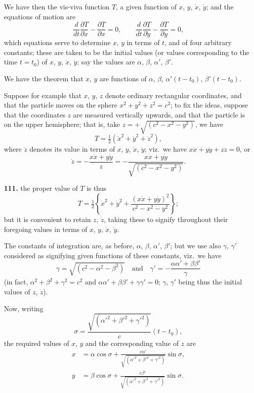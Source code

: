\documentclass[11pt,a4paper]{article}
\theoremstyle{plain}
\begin{document}
We have then the vis-viva function $T$, a given function of $x$, $y$, $\dot{x}$, $\dot{y}$; and the equations of motion are
\[
\frac{d}{dt}\frac{\partial T}{\partial \dot{x}} - \frac{\partial T}{\partial x} = 0, \qquad
\frac{d}{dt}\frac{\partial T}{\partial \dot{y}} - \frac{\partial T}{\partial y} = 0,
\]
which equations serve to determine $x$, $y$ in terms of $t$, and of four arbitrary constants; these are taken to be the initial values (or values corresponding to the time $t = t_0$) of $x$, $y$, $\dot{x}$, $\dot{y}$; say the values are $\alpha$, $\beta$, $\alpha'$, $\beta'$.

We have the theorem that $x$, $y$ are functions of $\alpha$, $\beta$, $\alpha'(t - t_0)$, $\beta'(t - t_0)$.

Suppose for example that $x$, $y$, $z$ denote ordinary rectangular coordinates, and that the particle moves on the sphere $x^2 + y^2 + z^2 = c^2$; to fix the ideas, suppose that the coordinates $z$ are measured vertically upwards, and that the particle is on the upper hemisphere; that is, take $z = +\sqrt{(c^2 - x^2 - y^2)}$, we have
\[
T = \tfrac{1}{2}(\dot{x}^2 + \dot{y}^2 + \dot{z}^2),
\]
where $\dot{z}$ denotes its value in terms of $x$, $y$, $\dot{x}$, $\dot{y}$; viz.\ we have $x\dot{x} + y\dot{y} + z\dot{z} = 0$, or
\[
\dot{z} = -\frac{x\dot{x} + y\dot{y}}{z} = -\frac{x\dot{x} + y\dot{y}}{\sqrt{(c^2 - x^2 - y^2)}}.
\]


\noindent\textbf{111.} the proper value of $T$ is thus
\[
T = \tfrac{1}{2}\left\{\dot{x}^2 + \dot{y}^2 + \frac{(x\dot{x} + y\dot{y})^2}{c^2 - x^2 - y^2}\right\};
\]
but it is convenient to retain $z$, $\dot{z}$, taking these to signify throughout their foregoing values in terms of $x$, $y$, $\dot{x}$, $\dot{y}$.

The constants of integration are, as before, $\alpha$, $\beta$, $\alpha'$, $\beta'$; but we use also $\gamma$, $\gamma'$ considered as signifying given functions of these constants, viz.\ we have
\[
\gamma = \sqrt{(c^2 - \alpha^2 - \beta^2)} \quad \text{and} \quad \gamma' = -\frac{\alpha\alpha' + \beta\beta'}{\gamma}
\]
(in fact, $\alpha^2 + \beta^2 + \gamma^2 = c^2$ and $\alpha\alpha' + \beta\beta' + \gamma\gamma' = 0$; $\gamma$, $\gamma'$ being thus the initial values of $z$, $\dot{z}$).

Now, writing
\[
\sigma = \frac{\sqrt{(\alpha'^2 + \beta'^2 + \gamma'^2)}}{c}(t - t_0),
\]
the required values of $x$, $y$ and the corresponding value of $z$ are
\begin{align*}
x &= \alpha\cos\sigma + \frac{c\alpha'}{\sqrt{(\alpha'^2 + \beta'^2 + \gamma'^2)}}\sin\sigma, \\
y &= \beta\cos\sigma + \frac{c\beta'}{\sqrt{(\alpha'^2 + \beta'^2 + \gamma'^2)}}\sin\sigma.
\end{align*}
\end{document}
